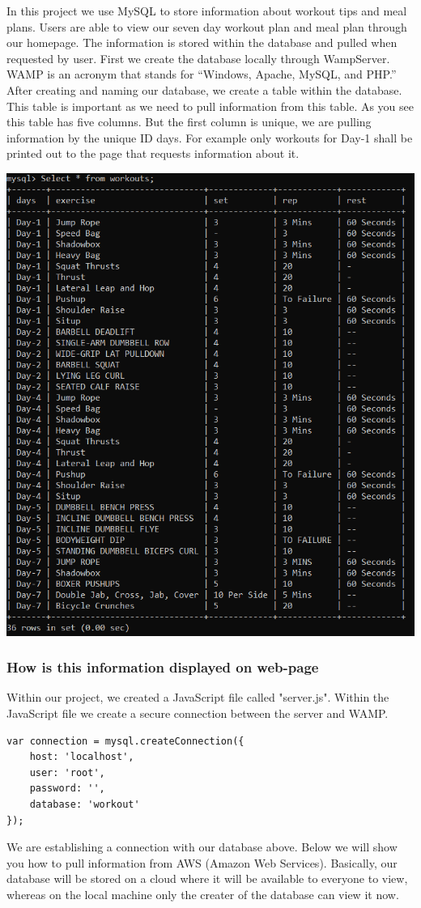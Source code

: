 \documentclass[a4paper,12pt,twoside]{report}
\begin{document}
In this project we use MySQL to store information about workout tips and meal plans. Users are able to view our seven day workout plan and meal plan through our homepage. The information is stored within the database and pulled when requested by user.
First we create the database locally through WampServer. WAMP is an acronym that stands for “Windows, Apache, MySQL, and PHP.” After creating and naming our database, we create a table within the database. 
This table is important as we need to pull information from this table. As you see this table has five columns. But the first column is unique, we are pulling information by the unique ID days. For example only workouts for Day-1 shall be printed out to the page that requests information about it.
\begin{center}
\includegraphics[scale=.7]{images/workouts-table.PNG}
\end{center}
\subsubsection{How is this information displayed on web-page}
Within our project, we created a JavaScript file called "server.js". Within the JavaScript file we create a secure connection between the server and WAMP.
\begin{verbatim}
var connection = mysql.createConnection({
    host: 'localhost',
    user: 'root',
    password: '',
    database: 'workout'
});
\end{verbatim}
We are establishing a connection with our database above. Below we will show you how to pull information from AWS (Amazon Web Services). Basically, our database will be stored on a cloud where it will be available to everyone to view, whereas on the local machine only the creater of the database can view it now.
\end{document}
